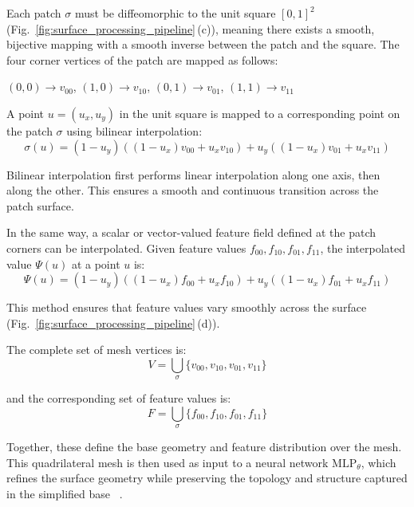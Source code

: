Each patch $\sigma$ must be diffeomorphic to the unit square $[0,1]^2$ (Fig.~\ref{fig:surface_processing_pipeline}\,(c)), meaning there exists a smooth, bijective mapping with a smooth inverse between the patch and the square. 
The four corner vertices of the patch are mapped as follows:

\quad $(0,0) \rightarrow v_{00}$, \quad $(1,0) \rightarrow v_{10}$, \quad $(0,1) \rightarrow v_{01}$, \quad $(1,1) \rightarrow v_{11}$ 

A point $u = (u_x, u_y)$ in the unit square is mapped to a corresponding point on the patch $\sigma$ using bilinear interpolation: 
\[\sigma(u) = (1 - u_y)((1 - u_x)v_{00} + u_x v_{10}) + u_y((1 - u_x)v_{01} + u_x v_{11})\] 

Bilinear interpolation first performs linear interpolation along one axis, then along the other. 
This ensures a smooth and continuous transition across the patch surface. 

In the same way, a scalar or vector-valued feature field defined at the patch corners can be interpolated. 
Given feature values $f_{00}, f_{10}, f_{01}, f_{11}$, the interpolated value $\Psi(u)$ at a point $u$ is: 
\[\Psi(u) = (1 - u_y)((1 - u_x)f_{00} + u_x f_{10}) + u_y((1 - u_x)f_{01} + u_x f_{11})\] 

This method ensures that feature values vary smoothly across the surface (Fig.~\ref{fig:surface_processing_pipeline}\,(d)). 

The complete set of mesh vertices is: 
\[V = \bigcup_{\sigma} \{v_{00}, v_{10}, v_{01}, v_{11} \}\] 

and the corresponding set of feature values is: 
\[F = \bigcup_{\sigma} \{f_{00}, f_{10}, f_{01}, f_{11} \}\] 

Together, these define the base geometry and feature distribution over the mesh. 
This quadrilateral mesh is then used as input to a neural network $\mathrm{MLP}_\theta$, which refines the surface geometry while preserving the topology and structure captured in the simplified base ~\cite{sivaram2024}.








